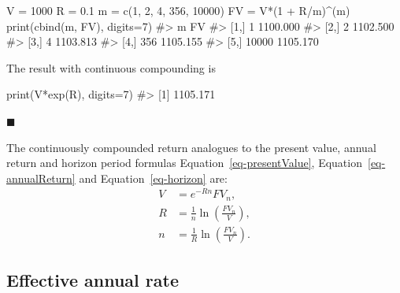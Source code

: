 \documentclass[
  letterpaper,
  DIV=11,
  numbers=noendperiod]{scrreprt}
\newenvironment{Shaded}{\begin{snugshade}}{\end{snugshade}}
\newcommand{\AttributeTok}[1]{\textcolor[rgb]{0.40,0.45,0.13}{#1}}
\newcommand{\CommentTok}[1]{\textcolor[rgb]{0.37,0.37,0.37}{#1}}
\newcommand{\DecValTok}[1]{\textcolor[rgb]{0.68,0.00,0.00}{#1}}
\newcommand{\FloatTok}[1]{\textcolor[rgb]{0.68,0.00,0.00}{#1}}
\newcommand{\FunctionTok}[1]{\textcolor[rgb]{0.28,0.35,0.67}{#1}}
\newcommand{\NormalTok}[1]{\textcolor[rgb]{0.00,0.23,0.31}{#1}}
\newcommand{\OtherTok}[1]{\textcolor[rgb]{0.00,0.23,0.31}{#1}}
\newcommand{\SpecialCharTok}[1]{\textcolor[rgb]{0.37,0.37,0.37}{#1}}
\theoremstyle{definition}
\theoremstyle{definition}
\theoremstyle{remark}
\begin{document}
\begin{Shaded}
\begin{Highlighting}[]
\NormalTok{V }\OtherTok{=} \DecValTok{1000} 
\NormalTok{R }\OtherTok{=} \FloatTok{0.1} 
\NormalTok{m }\OtherTok{=} \FunctionTok{c}\NormalTok{(}\DecValTok{1}\NormalTok{, }\DecValTok{2}\NormalTok{, }\DecValTok{4}\NormalTok{, }\DecValTok{356}\NormalTok{, }\DecValTok{10000}\NormalTok{) }
\NormalTok{FV }\OtherTok{=}\NormalTok{ V}\SpecialCharTok{*}\NormalTok{(}\DecValTok{1} \SpecialCharTok{+}\NormalTok{ R}\SpecialCharTok{/}\NormalTok{m)}\SpecialCharTok{\^{}}\NormalTok{(m) }
\FunctionTok{print}\NormalTok{(}\FunctionTok{cbind}\NormalTok{(m, FV), }\AttributeTok{digits=}\DecValTok{7}\NormalTok{)}
\CommentTok{\#\textgreater{}          m       FV}
\CommentTok{\#\textgreater{} [1,]     1 1100.000}
\CommentTok{\#\textgreater{} [2,]     2 1102.500}
\CommentTok{\#\textgreater{} [3,]     4 1103.813}
\CommentTok{\#\textgreater{} [4,]   356 1105.155}
\CommentTok{\#\textgreater{} [5,] 10000 1105.170}
\end{Highlighting}
\end{Shaded}

The result with continuous compounding is

\begin{Shaded}
\begin{Highlighting}[]
\FunctionTok{print}\NormalTok{(V}\SpecialCharTok{*}\FunctionTok{exp}\NormalTok{(R), }\AttributeTok{digits=}\DecValTok{7}\NormalTok{)}
\CommentTok{\#\textgreater{} [1] 1105.171}
\end{Highlighting}
\end{Shaded}

\hfill{}\(\blacksquare\)

The continuously compounded return analogues to the present value,
annual return and horizon period formulas
Equation~\ref{eq-presentValue}, Equation~\ref{eq-annualReturn} and
Equation~\ref{eq-horizon} are: \begin{align*}
V & =e^{-Rn}FV_{n},\\
R & =\frac{1}{n}\ln\left(\frac{FV_{n}}{V}\right),\\
n & =\frac{1}{R}\ln\left(\frac{FV_{n}}{V}\right).
\end{align*}

\hypertarget{effective-annual-rate}{%
\subsection{Effective annual rate}\label{effective-annual-rate}}
\end{document}
